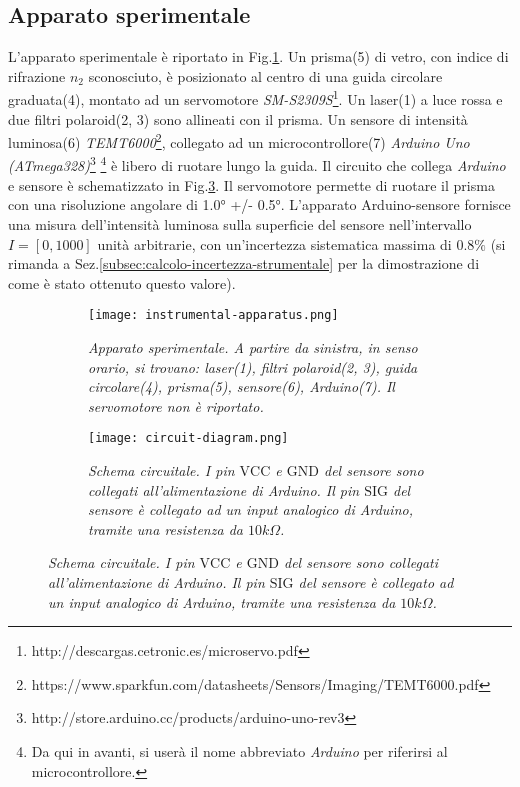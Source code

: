 \subsection{Apparato sperimentale}\label{subsec:apparato-sperimentale}
  L’apparato sperimentale è riportato in Fig.\ref{fig:apparato-strumentale}.
  Un prisma(5) di vetro, con indice di rifrazione $n_2$ sconosciuto, è posizionato al centro di una guida circolare graduata(4),
  montato ad un servomotore \emph{SM-S2309S}\footnote{http://descargas.cetronic.es/microservo.pdf}.
  Un laser(1) a luce rossa e due filtri polaroid(2, 3) sono
  allineati con il prisma. Un sensore di intensità luminosa(6) \emph{TEMT6000}\footnote{https://www.sparkfun.com/datasheets/Sensors/Imaging/TEMT6000.pdf},
  collegato ad un microcontrollore(7) \emph{Arduino Uno (ATmega328)}\footnote{http://store.arduino.cc/products/arduino-uno-rev3}%
  \footnote{Da qui in avanti, si userà il nome abbreviato \emph{Arduino} per riferirsi al microcontrollore.}
  è libero di ruotare lungo la guida.
  Il circuito che collega \emph{Arduino} e sensore è schematizzato in Fig.\ref{fig:diagramma-circuito}.
  Il servomotore permette di ruotare il prisma con una risoluzione angolare di 1.0° +/- 0.5°.
  L'apparato Arduino-sensore fornisce una misura dell'intensità luminosa
  sulla superficie del sensore nell'intervallo $I = [0, 1000]$ unità arbitrarie,
  con un'incertezza sistematica massima di $0.8\%$ (si rimanda a Sez.\ref{subsec:calcolo-incertezza-strumentale}
  per la dimostrazione di come è stato ottenuto questo valore).
%
  \begin{figure}[h]
    \centering
    \caption{Apparato sperimentale e schema circuitale.}
    \begin{subfigure}{.4\textwidth}
      \texttt{[image: instrumental-apparatus.png]}
      \caption{
        \emph{
          Apparato sperimentale. A partire da sinistra, in senso orario,
          si trovano: laser(1), filtri polaroid(2, 3), guida circolare(4),
          prisma(5), sensore(6), Arduino(7). Il servomotore non è riportato.
        }
      }
      \label{fig:apparato-strumentale}
    \end{subfigure}%
    \hspace{20mm}
    \begin{subfigure}{.4\textwidth}
      \texttt{[image: circuit-diagram.png]}
      \caption{
        \emph{
          Schema circuitale. I pin $\text{VCC}$ e $\text{GND}$ del sensore sono collegati
          all'alimentazione di Arduino. Il pin $\text{SIG}$
          del sensore è collegato ad un input analogico di Arduino, tramite una
          resistenza da $10k\Omega$.
        }
      }
      \label{fig:diagramma-circuito}
    \end{subfigure}
  \end{figure}
%
